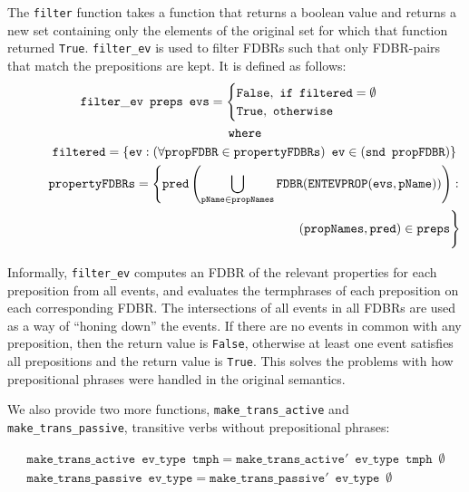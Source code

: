 \documentclass[../main.tex]{subfiles}
\begin{document}
The \texttt{filter} function takes a function that returns a boolean value and returns a new set containing only the elements of the original set for which that function returned \texttt{True}.
\texttt{filter\_ev} is used to filter FDBRs such that only FDBR-pairs that match
the prepositions are kept. It is defined as follows:\\

{\setlength{\mathindent}{0cm}
\begin{gather*}
\mathtt{filter\_ev}\enspace \mathtt{preps}\enspace \mathtt{evs} =
\begin{cases}
\mathtt{False},\ \mathtt{if}\enspace \mathtt{filtered} = \mathtt{\emptyset} \\
\mathtt{True},\ \mathtt{otherwise}
\end{cases} \\
\mathtt{\indent where} \\
\mathtt{\indent\indent filtered} = \left\{ \mathtt{ev} : \left( \forall \mathtt{propFDBR} \in
\mathtt{propertyFDBRs} \right)\ \mathtt{ev} \in (\mathtt{snd}\enspace \mathtt{propFDBR}) \right\}  \\
\begin{split}
\mathtt{\indent\indent propertyFDBRs} = \left\{ \mathtt{pred}\left(\bigcup_{\mathtt{pName} \in \mathtt{propNames}} \mathtt{FDBR}(\mathtt{ENTEVPROP}(\mathtt{evs}, \mathtt{pName})) \right) : \right. \\
\left. (\mathtt{propNames}, \mathtt{pred}) \in \mathtt{preps} \vphantom{\bigcup_{\mathtt{pName} \in \mathtt{propNames}}} \right\}
\end{split}
\end{gather*}
}

Informally, \texttt{filter\_ev} computes an FDBR of the relevant properties for
each preposition from all events, and evaluates the termphrases of each
preposition on each corresponding FDBR.  The intersections of all events in all
FDBRs are used as a way
of ``honing down'' the events.  If there are no events in common with any
preposition, then the return value is \texttt{False}, otherwise at least
one event satisfies all prepositions and the return value is \texttt{True}.
This solves the problems with how prepositional phrases were handled in the
original semantics.

We also provide two more functions, \texttt{make\_trans\_active} and \texttt{make\_trans\_passive}, transitive verbs without prepositional phrases:

\begin{gather*}
\mathtt{make\_trans\_active}\enspace \mathtt{ev\_type}\enspace \mathtt{tmph} = \mathtt{make\_trans\_active'}\enspace \mathtt{ev\_type}\enspace \mathtt{tmph}\enspace \mathtt{\emptyset}\\
\mathtt{make\_trans\_passive}\enspace \mathtt{ev\_type} = \mathtt{make\_trans\_passive'}\enspace \mathtt{ev\_type}\enspace \emptyset
\end{gather*}
\end{document}

